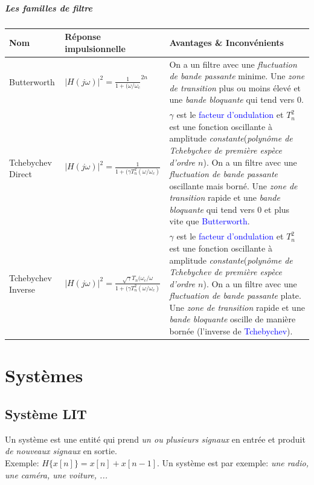 \documentclass{report}
\begin{document}
\subsubsection{Les familles de filtre}
\begin{center}
\begin{tabular}{|m{3cm}|m{5cm}|m{7cm}|}
\hline
\cellcolor[gray]{0.8} Nom &\cellcolor[gray]{0.8} Réponse impulsionnelle & \cellcolor[gray]{0.8} Avantages \& Inconvénients\\
\hline
Butterworth & $|H(j\omega)|^2 = \frac{1}{1+(\omega/\omega_c}^{2n}$ & On a un filtre avec une \textit{fluctuation de bande passante} minime. Une \textit{zone de transition} plus ou moins élevé et une \textit{bande bloquante} qui tend vers 0.\\
\hline
Tchebychev Direct & $|H(j\omega)|^2 = \frac{1}{1+(\gamma T_n^2 (\omega /\omega_c)}$ &$\gamma$ est le \textcolor{blue}{facteur d'ondulation} et $T_n^2$ est une fonction oscillante à amplitude \textit{constante}(\textit{polynôme de Tchebychev de première espèce d'ordre $n$}). On a un filtre avec une \textit{fluctuation de bande passante} oscillante mais borné. Une \textit{zone de transition} rapide et une \textit{bande bloquante} qui tend vers 0 et plus vite que \textcolor{blue}{Butterworth}.\\
\hline
Tchebychev Inverse & $|H(j\omega)|^2 = \frac{\sqrt{\gamma}T_n(\omega_c/\omega}{1+(\gamma T_n^2 (\omega /\omega_c)}$ &$\gamma$ est le \textcolor{blue}{facteur d'ondulation} et $T_n^2$ est une fonction oscillante à amplitude \textit{constante}(\textit{polynôme de Tchebychev de première espèce d'ordre $n$}). On a un filtre avec une \textit{fluctuation de bande passante} plate. Une \textit{zone de transition} rapide et une \textit{bande bloquante} oscille de manière bornée (l'inverse de \textcolor{blue}{Tchebychev}).\\
\hline
\end{tabular}
\end{center}


\part{Systèmes}

\chapter{Système LIT}
Un système est une entité qui prend \textit{un ou plusieurs signaux} en entrée et produit \textit{de nouveaux signaux} en sortie.\\
Exemple: $H\{x[n]\} = x[n] + x[n-1]$. Un système est par exemple: \textit{une radio, une caméra, une voiture, ...}
\end{document}
